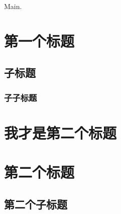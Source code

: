 \documentclass{article}
\begin{document}
Main.

\section{第一个标题}

\subsection{子标题}

\subsubsection{子子标题}

\section{我才是第二个标题}

\section{第二个标题}

\subsection{第二个子标题}
\end{document}
